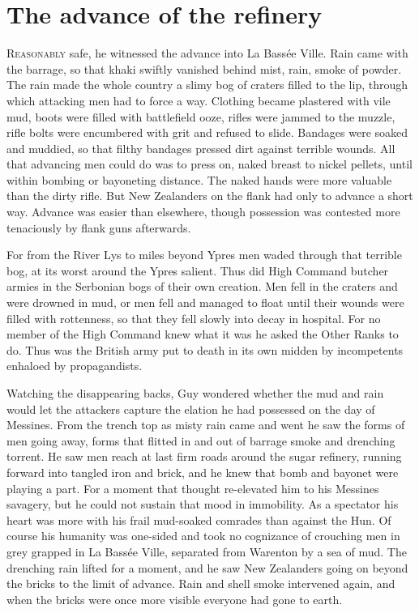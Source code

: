 \chapter*{\textsf{The advance of the refinery}}

R\textsc{easonably} safe, he witnessed the advance into La Bass\'{e}e Ville. Rain came with the barrage, so that khaki swiftly vanished behind mist, rain, smoke of powder. The rain made the whole country a slimy bog of craters filled to the lip, through which attacking men had to force a way. Clothing became plastered with vile mud, boots were filled with battlefield ooze, rifles were jammed to the muzzle, rifle bolts were encumbered with grit and refused to slide. Bandages were soaked and muddied, so that filthy bandages pressed dirt against terrible wounds. All that advancing men could do was to press on, naked breast to nickel pellets, until within bombing or bayoneting distance. The naked hands were more valuable than the dirty rifle. But New Zealanders on the flank had only to advance a short way. Advance was easier than elsewhere, though possession was contested more tenaciously by flank guns afterwards.

For from the River Lys to miles beyond Ypres men waded through that terrible bog, at its worst around the Ypres salient. Thus did High Command butcher armies in the Serbonian bogs of their own creation. Men fell in the craters and were drowned in mud, or men fell and managed to float until their wounds were filled with rottenness, so that they fell slowly into decay in hospital. For no member of the High Command knew what it was he asked the Other Ranks to do. Thus was the British army put to death in its own midden by incompetents enhaloed by propagandists.

Watching the disappearing backs, Guy wondered whether the mud and rain would let the attackers capture the elation he had possessed on the day of Messines. From the trench top as misty rain came and went he saw the forms of men going away, forms that flitted in and out of barrage smoke and drenching torrent. He saw men reach at last firm roads around the sugar refinery, running forward into tangled iron and brick, and he knew that bomb and bayonet were playing a part. For a moment that thought re-elevated him to his Messines savagery, but he could not sustain that mood in immobility. As a spectator his heart was more with his frail mud-soaked comrades than against the Hun. Of course his humanity was one-sided and took no cognizance of crouching men in grey grapped in La Bass\'{e}e Ville, separated from Warenton by a sea of mud. The drenching rain lifted for a moment, and he saw New Zealanders going on beyond the bricks to the limit of advance. Rain and shell smoke intervened again, and when the bricks were once more visible everyone had gone to earth.


